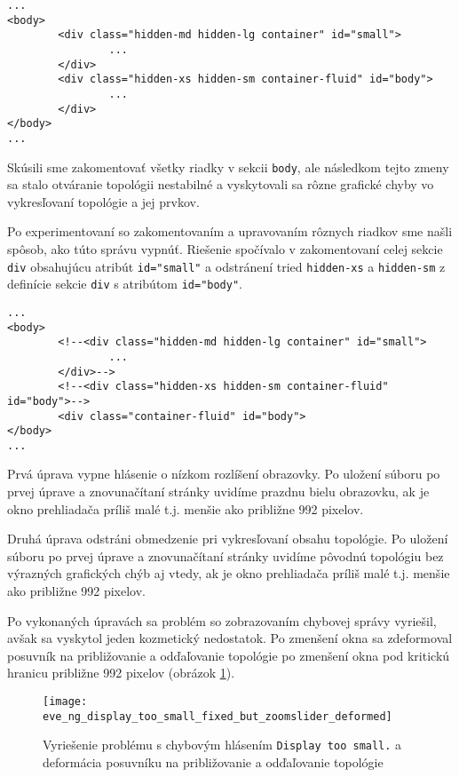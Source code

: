 \begin{verbatim}
...
<body>
        <div class="hidden-md hidden-lg container" id="small">
                ...
        </div>
        <div class="hidden-xs hidden-sm container-fluid" id="body">
                ...
        </div>
</body>
...
\end{verbatim}

Skúsili sme zakomentovať všetky riadky v sekcii \texttt{body}, ale následkom tejto zmeny sa stalo otváranie topológii nestabilné a vyskytovali sa rôzne grafické chyby vo vykresľovaní topológie a jej prvkov.

Po experimentovaní so zakomentovaním a upravovaním rôznych riadkov sme našli spôsob, ako túto správu vypnúť. Riešenie spočívalo v zakomentovaní celej sekcie \texttt{div} obsahujúcu atribút \texttt{id="small"} a odstránení tried \texttt{hidden-xs} a \texttt{hidden-sm} z definície sekcie \texttt{div} s atribútom \texttt{id="body"}.

\begin{verbatim}
...
<body>
        <!--<div class="hidden-md hidden-lg container" id="small">
                ...
        </div>-->
        <!--<div class="hidden-xs hidden-sm container-fluid" id="body">-->
        <div class="container-fluid" id="body">
</body>
...
\end{verbatim}

Prvá úprava vypne hlásenie o nízkom rozlíšení obrazovky. Po uložení súboru po prvej úprave a znovunačítaní stránky uvidíme prazdnu bielu obrazovku, ak je okno prehliadača príliš malé t.j. menšie ako približne 992 pixelov.

Druhá úprava odstráni obmedzenie pri vykresľovaní obsahu topológie. Po uložení súboru po prvej úprave a znovunačítaní stránky uvidíme pôvodnú topológiu bez výrazných grafických chýb aj vtedy, ak je okno prehliadača príliš malé t.j. menšie ako približne 992 pixelov.

Po vykonaných úpravách sa problém so zobrazovaním chybovej správy vyriešil, avšak sa vyskytol jeden kozmetický nedostatok. Po zmenšení okna sa zdeformoval posuvník na približovanie a odďaľovanie topológie po zmenšení okna pod kritickú hranicu približne 992 pixelov (obrázok \ref{obr:eve_ng_display_too_small_fixed_but_zoomslider_deformed}).

\begin{figure}
    \centering
    \texttt{[image: eve\_ng\_display\_too\_small\_fixed\_but\_zoomslider\_deformed]}
    \caption{Vyriešenie problému s chybovým hlásením \texttt{Display too small.} a deformácia posuvníku na približovanie a odďaľovanie topológie}
    \label{obr:eve_ng_display_too_small_fixed_but_zoomslider_deformed}
\end{figure}

